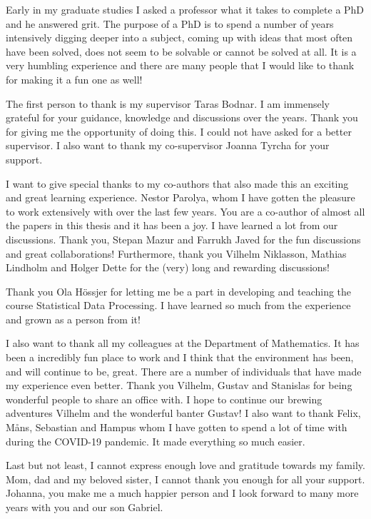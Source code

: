 Early in my graduate studies I asked a professor what it takes to complete a PhD and he answered grit.
The purpose of a PhD is to spend a number of years intensively digging deeper into a subject, coming up with ideas that most often have been solved, does not seem to be solvable or cannot be solved at all.
It is a very humbling experience and there are many people that I would like to thank for making it a fun one as well!

The first person to thank is my supervisor Taras Bodnar.
I am immensely grateful for your guidance, knowledge and discussions over the years.
Thank you for giving me the opportunity of doing this.
I could not have asked for a better supervisor.
I also want to thank my co-supervisor Joanna Tyrcha for your support.

I want to give special thanks to my co-authors that also made this an exciting and great learning experience.
Nestor Parolya, whom I have gotten the pleasure to work extensively with over the last few years. 
You are a co-author of almost all the papers in this thesis and it has been a joy.
I have learned a lot from our discussions.
Thank you, Stepan Mazur and Farrukh Javed for the fun discussions and great collaborations!
Furthermore, thank you Vilhelm Niklasson, Mathias Lindholm and Holger Dette for the (very) long and rewarding discussions! 

Thank you Ola Hössjer for letting me be a part in developing and teaching the course Statistical Data Processing.
I have learned so much from the experience and grown as a person from it!

I also want to thank all my colleagues at the Department of Mathematics.
It has been a incredibly fun place to work and I think that the environment has been, and will continue to be, great.
There are a number of individuals that have made my experience even better.
Thank you Vilhelm, Gustav and Stanislas for being wonderful people to share an office with.
I hope to continue our brewing adventures Vilhelm and the wonderful banter Gustav!
I also want to thank Felix, Måns, Sebastian and Hampus whom I have gotten to spend a lot of time with during the COVID-19 pandemic. 
It made everything so much easier.

Last but not least, I cannot express enough love and gratitude towards my family. 
Mom, dad and my beloved sister, I cannot thank you enough for all your support.
Johanna, you make me a much happier person and I look forward to many more years with you and our son Gabriel. 